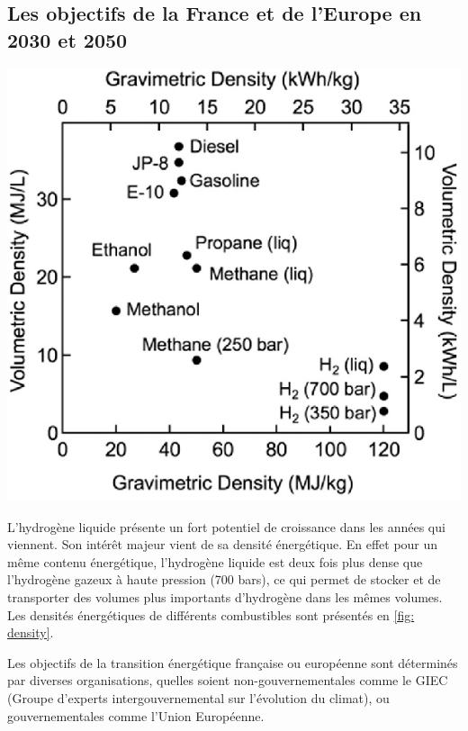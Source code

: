 \documentclass[11pt,french,a4paper]{article}
\begin{document}
\subsection{Les objectifs de la France et de l'Europe en 2030 et 2050}
\begin{multicols}{2}

\begin{center}
\includegraphics[width=.8\linewidth]{image/chap1/e-Comparison-of-gravimetric-density-and-volumetric-density-of-several-fuels-depending-on.PNG}
\label{fig: density}
\end{center}

L’hydrogène liquide présente un fort potentiel de croissance dans les années qui viennent. Son intérêt majeur vient de sa densité énergétique. En effet pour un même contenu énergétique, l’hydrogène liquide est deux fois plus dense que l’hydrogène gazeux à haute pression (700 bars), ce qui permet de stocker et de transporter des volumes plus importants d’hydrogène dans les mêmes volumes. Les densités énergétiques de différents combustibles sont présentés en \ref{fig: density}.

\end{multicols}

Les objectifs de la transition énergétique française ou européenne sont déterminés par diverses organisations, quelles soient non-gouvernementales comme le GIEC (Groupe d'experts intergouvernemental sur l'évolution du climat), ou gouvernementales comme l'Union Européenne.
\end{document}
